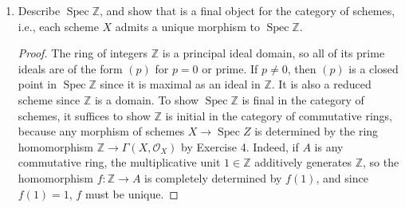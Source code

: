\documentclass{article}
\newcommand{\goth}[1]{\textfrak{#1}}
\newcommand{\fO}{\mathscr{O}}
\newcommand{\gm}{\goth{m}}
\newcommand{\Z}{\mathbb{Z}}
\DeclareMathOperator{\spec}{Spec}
\begin{document}
\begin{enumerate} [label=\textbf{\arabic*.}, leftmargin=0em]
\begin{proof}
    We want to show the homomorphism between global sections $A \to \Gamma(X, \fO_X)$ completely determines the morphism $f : X \to \spec{B}$. We can check this locally on $X$. Let $V = \spec{B}$ be an open affine subset of $X$. We also have a homomorphism of global sections $A \to \Gamma(V, \fO_X) = B$ by composing with the inclusion morphism, which fits into the following commutative diagram
    \[ \begin{tikzcd}
        & {\Gamma(X, \fO_X)} \arrow[rd] &                               \\
A \arrow[ru] \arrow[rr] &                               & {\Gamma(\spec{B}, \fO_X) = B}
    \end{tikzcd} \]
    where $\Gamma(X, \fO_X) \to B$ is the natural restriction homomorphism. By equivalence of the category of rings and affine schemes, we conclude that $\alpha$ is injective.

    It remains to show $\alpha$ is surjective. Let $\varphi : A \to \Gamma(X, \fO_X)$ be a homomorphism of global sections. For each $x \in X$, let $\goth{m}_x$ be the maximal ideal of $\fO_{x, X}$, and let $i_x : \Gamma(X, \fO_X) \to \fO_{x, X}$ be the natural map. Then define $\tilde{\varphi} : X \to \spec{A}$ by $x \mapsto (i_x \circ \varphi)^{-1}(\goth{m}_x)$. This coincides with the case when $X$ is affine. Indeed, suppose $X = \spec{B}$ for some ring $B$, and let $\goth{p} \in \spec{B}$ corresponding to $x$. The inclusion homeomorphism $i_x : \Gamma(X, \fO_X) \to \fO_{x, X}$ is precisely the natural map $i_\goth{p} : B \to B_\goth{p}$ associated to localization. Thus, $i_x(\gm_x) = \goth{p} \in B$, and $\tilde{\varphi}(x) = \varphi^{-1}(\goth{p})$.
\end{proof}

\item Describe $\spec{\Z}$, and show that is a final object for the category of schemes, i.e., each scheme $X$ admits a unique morphism to $\spec{\Z}$.

\begin{proof}
    The ring of integers $\Z$ is a principal ideal domain, so all of its prime ideals are of the form $(p)$ for $p = 0$ or prime. If $p \neq 0$, then $(p)$ is a closed point in $\spec{\Z}$ since it is maximal as an ideal in $\Z$. It is also a reduced scheme since $\Z$ is a domain. To show $\spec{\Z}$ is final in the category of schemes, it suffices to show $\Z$ is initial in the category of commutative rings, because any morphism of schemes $X \to \spec{Z}$ is determined by the ring homomorphism $\Z \to \Gamma(X, \fO_X)$ by Exercise 4. Indeed, if $A$ is any commutative ring, the multiplicative unit $1 \in \Z$ additively generates $\Z$, so the homomorphism $f : \Z \to A$ is completely determined by $f(1)$, and since $f(1) = 1$, $f$ must be unique.
\end{proof}


\end{enumerate}
\end{document}
